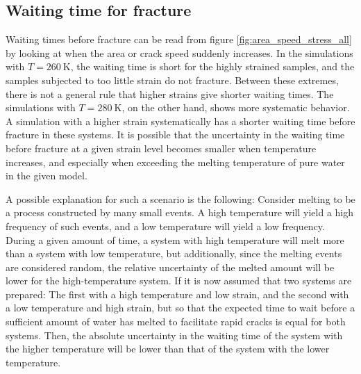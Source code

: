 \subsection{Waiting time for fracture}
Waiting times before fracture can be read from figure \ref{fig:area_speed_stress_all} by looking at when the area or crack speed suddenly increases. In the simulations with $T=\SI{260}{\kelvin}$, the waiting time is short for the highly strained samples, and the samples subjected to too little strain do not fracture. Between these extremes, there is not a general rule that higher strains give shorter waiting times. The simulations with $T=\SI{280}{\kelvin}$, on the other hand, shows more systematic behavior. A simulation with a higher strain systematically has a shorter waiting time before fracture in these systems. It is possible that the uncertainty in the waiting time before fracture at a given strain level becomes smaller when temperature increases, and especially when exceeding the melting temperature of pure water in the given model. 

A possible explanation for such a scenario is the following: Consider melting to be a process constructed by many small events. A high temperature will yield a high frequency of such events, and a low temperature will yield a low frequency. During a given amount of time, a system with high temperature will melt more than a system with low temperature, but additionally, since the melting events are considered random, the relative uncertainty of the melted amount will be lower for the high-temperature system. If it is now assumed that two systems are prepared: The first with a high temperature and low strain, and the second with a low temperature and high strain, but so that the expected time to wait before a sufficient amount of water has melted to facilitate rapid cracks is equal for both systems. Then, the absolute uncertainty in the waiting time of the system with the higher temperature will be lower than that of the system with the lower temperature.

